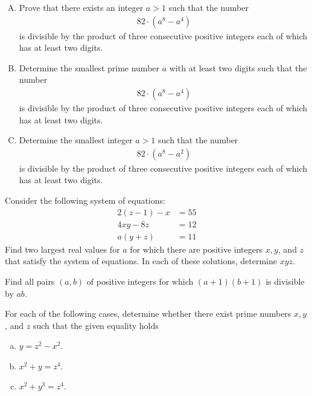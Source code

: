 \begin{problem} $ $
	\begin{enumerate}[(A)]
		\item Prove that there exists an integer $a>1$ such that the number
		\begin{align*}
			82 \cdot \left(a^8 - a^4\right)
		\end{align*}
		is divisible by the product of three consecutive positive integers each of which has at least two digits.
		\item Determine the smallest prime number $a$ with at least two digits such that the number
		\begin{align*}
			82 \cdot \left(a^8 - a^4\right)
		\end{align*}
		is divisible by the product of three consecutive positive integers each of which has at least two digits.
		\item Determine the smallest integer $a>1$ such that the number
		\begin{align*}
			82 \cdot \left(a^8 - a^2\right)
		\end{align*}
		is divisible by the product of three consecutive positive integers each of which has at least two digits.
	\end{enumerate}
\end{problem}

\begin{problem}
	Consider the following system of equations:
	\begin{align*}
		2(z-1) - x &= 55\\
		4xy - 8z   &= 12\\
		a(y+z)     &= 11
	\end{align*}
	Find two largest real values for $a$ for which there are positive integers $x, y$, and $z$ that satisfy the system of equations. In each of these solutions, determine $xyz$.
\end{problem}

\begin{problem}
	Find all pairs $(a, b)$ of positive integers for which $(a + 1) (b + 1)$ is divisible by $ab$.
\end{problem}

\begin{problem}
	For each of the following cases, determine whether there exist prime numbers $x,y$, and $z$ such that the given equality holds
	\begin{enumerate}[(a)]
		\item $y=z^2-x^2$.
		\item $x^2+y=z^4$.
		\item $x^2 +y^3 = z^4$.
	\end{enumerate}
\end{problem}

